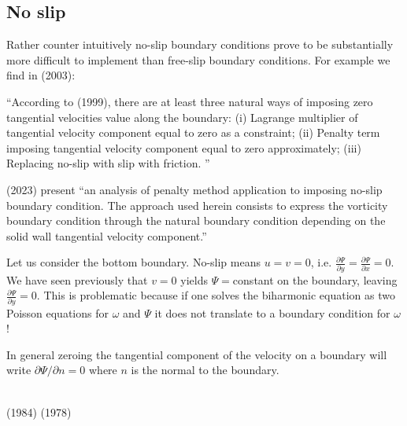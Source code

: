 \subsection{No slip}

Rather counter intuitively no-slip boundary conditions prove to be substantially 
more difficult to implement than free-slip boundary conditions.
For example we find in \textcite{dedz03} (2003):
\begin{displayquote}
{\color{darkgray}
``According to \textcite{layt99} (1999), there are at least three natural ways of imposing zero tangential
velocities value along the boundary:
(i) Lagrange multiplier of tangential velocity component equal to zero as a constraint;
(ii) Penalty term imposing tangential velocity component equal to zero approximately;
(iii) Replacing no-slip with slip with friction.
''}
\end{displayquote}
\textcite{dedz03} (2023) present ``an analysis of penalty method application to imposing no-slip boundary
condition. The approach used herein consists to express the vorticity boundary condition through
the natural boundary condition depending on the solid wall tangential velocity component.''

Let us consider the bottom boundary. No-slip means $u=v=0$, i.e.
$\frac{\partial \Psi}{\partial y}=\frac{\partial \Psi}{\partial x}=0$. 
We have seen previously that $v=0$ yields $\Psi=$constant on the boundary,
leaving $\frac{\partial \Psi}{\partial y}=0$. This is problematic because if 
one solves the biharmonic equation as two Poisson equations for $\omega$ and $\Psi$
it does not translate to a boundary condition for $\omega$!

In general zeroing the tangential component of the velocity on a boundary will 
write $\partial \Psi/ \partial n =0$ where $n$ is the normal to the boundary.

\begin{center}
\\
\textcite{chri84} (1984) \hspace{4cm}
\textcite{woid78} (1978)
\end{center}


